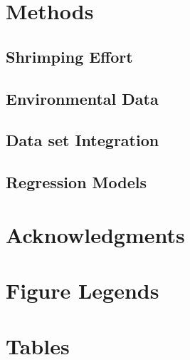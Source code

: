 \documentclass[10pt]{article}
\begin{document}
\section*{Methods}
\subsection*{Shrimping Effort}

\subsection*{Environmental Data}

\subsection*{Data set Integration}

\subsection*{Regression Models}

\section*{Acknowledgments}




\section*{Figure Legends}


\section*{Tables}
\end{document}
